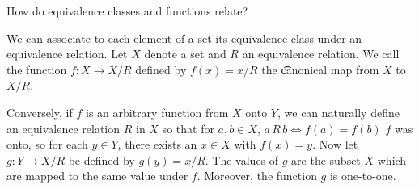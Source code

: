 

How do equivalence classes and functions relate?


We can associate to each element of a set its equivalence class under an equivalence relation.
Let $X$ denote a set and $R$ an equivalence relation.
We call the function $f: X \to X/R$ defined by $f(x) = x/R$ the \t{canonical map} from  $X$ to $X/R$.

Conversely, if $f$ is an arbitrary function from $X$ onto $Y$, we can naturally define an equivalence relation $R$ in $X$ so that for $a, b \in X$, $a\,R\,b \iff f(a) = f(b)$
$f$ was onto, so for each $y \in Y$, there exists an $x \in X$ with $f(x) = y$.
Now let $g: Y \to X/R$ be defined by $g(y) = x/R$.
The values of $g$ are the subset $X$ which are mapped to the same value under $f$.
Moreover, the function $g$ is one-to-one.

\blankpage
